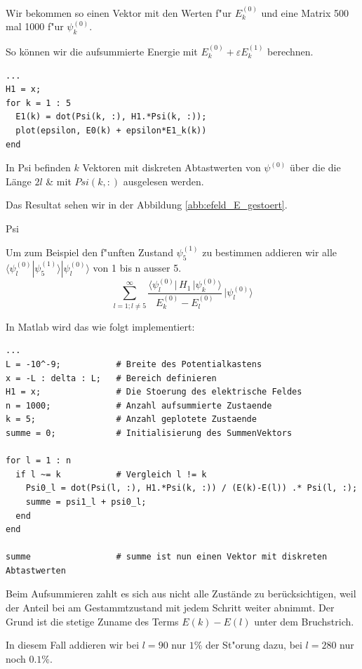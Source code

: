 \begin{refsection}
Wir bekommen so einen Vektor mit den Werten f"ur $E_k^{(0)}$
und eine Matrix 500 mal 1000 f"ur $\psi_k^{(0)}$.







So k\"onnen wir die aufsummierte Energie mit $E_k^{(0)} + \varepsilon E_k^{(1)}$ berechnen.

\begin{lstlisting}[style=Matlab]
...
H1 = x;
for k = 1 : 5
  E1(k) = dot(Psi(k, :), H1.*Psi(k, :));
  plot(epsilon, E0(k) + epsilon*E1_k(k))
end
\end{lstlisting}
In Psi befinden $k$ Vektoren mit diskreten Abtastwerten von $\psi^{(0)}$ \"uber die die L\"ange $2l$
\& mit $Psi(k, :)$ ausgelesen werden.

Das Resultat sehen wir in der Abbildung \ref{abb:efeld_E_gestoert}.

Psi

Um zum Beispiel den f"unften Zustand $\psi_5^{(1)}$ zu bestimmen addieren wir alle 
$\langle\psi_l^{(0)}|\psi_5^{(1)}\rangle|\psi_l^{(0)}\rangle$
 von 1 bis n ausser 5.
\begin{equation}
  \sum_{l=1 ; l\ne 5}^{\infty}
    \frac{\langle \psi_l^{(0)}|\, H_1 \,|\psi_k^{(0)}\rangle}{E_k^{(0)}-E_l^{(0)}}
        \,
    |\psi_l^{(0)}\rangle
\end{equation}

In Matlab wird das wie folgt implementiert:
\begin{lstlisting}[style=Matlab]
...
L = -10^-9;           # Breite des Potentialkastens
x = -L : delta : L;   # Bereich definieren
H1 = x;               # Die Stoerung des elektrische Feldes
n = 1000;             # Anzahl aufsummierte Zustaende
k = 5;                # Anzahl geplotete Zustaende
summe = 0;            # Initialisierung des SummenVektors

for l = 1 : n
  if l ~= k           # Vergleich l != k
    Psi0_l = dot(Psi(l, :), H1.*Psi(k, :)) / (E(k)-E(l)) .* Psi(l, :);
    summe = psi1_l + psi0_l;
  end
end

summe                 # summe ist nun einen Vektor mit diskreten Abtastwerten
\end{lstlisting}

Beim Aufsummieren zahlt es sich aus nicht alle Zust\"ande zu ber\"ucksichtigen, weil der Anteil bei am Gestammtzustand 
mit jedem Schritt weiter abnimmt. Der Grund ist die stetige Zuname des Terms $E(k)-E(l)$ unter dem Bruchstrich.

In diesem Fall addieren wir bei $l=90$ nur $1\%$ der St"orung dazu, bei $l=280$ nur noch $0.1\%$.


\end{refsection}
